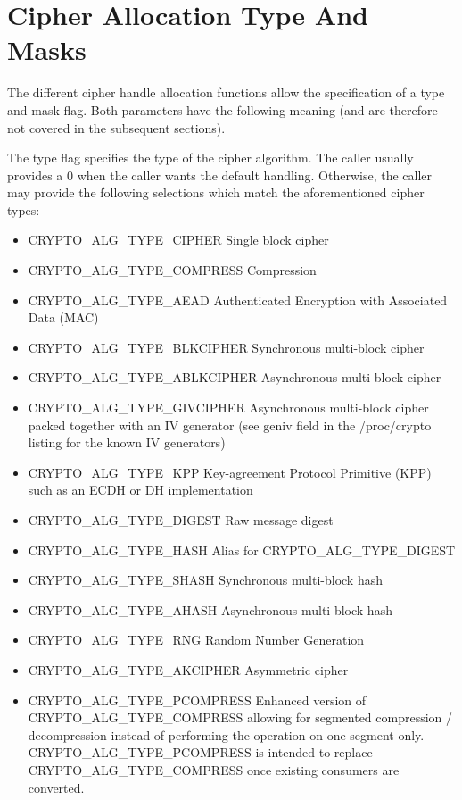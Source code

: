 \documentclass[a4paper,8pt,english]{sphinxmanual}
\begin{document}
\section{Cipher Allocation Type And Masks}
\label{crypto/architecture:cipher-allocation-type-and-masks}
The different cipher handle allocation functions allow the specification
of a type and mask flag. Both parameters have the following meaning (and
are therefore not covered in the subsequent sections).

The type flag specifies the type of the cipher algorithm. The caller
usually provides a 0 when the caller wants the default handling.
Otherwise, the caller may provide the following selections which match
the aforementioned cipher types:
\begin{itemize}
\item {} 
CRYPTO\_ALG\_TYPE\_CIPHER Single block cipher

\item {} 
CRYPTO\_ALG\_TYPE\_COMPRESS Compression

\item {} 
CRYPTO\_ALG\_TYPE\_AEAD Authenticated Encryption with Associated Data
(MAC)

\item {} 
CRYPTO\_ALG\_TYPE\_BLKCIPHER Synchronous multi-block cipher

\item {} 
CRYPTO\_ALG\_TYPE\_ABLKCIPHER Asynchronous multi-block cipher

\item {} 
CRYPTO\_ALG\_TYPE\_GIVCIPHER Asynchronous multi-block cipher packed
together with an IV generator (see geniv field in the /proc/crypto
listing for the known IV generators)

\item {} 
CRYPTO\_ALG\_TYPE\_KPP Key-agreement Protocol Primitive (KPP) such as
an ECDH or DH implementation

\item {} 
CRYPTO\_ALG\_TYPE\_DIGEST Raw message digest

\item {} 
CRYPTO\_ALG\_TYPE\_HASH Alias for CRYPTO\_ALG\_TYPE\_DIGEST

\item {} 
CRYPTO\_ALG\_TYPE\_SHASH Synchronous multi-block hash

\item {} 
CRYPTO\_ALG\_TYPE\_AHASH Asynchronous multi-block hash

\item {} 
CRYPTO\_ALG\_TYPE\_RNG Random Number Generation

\item {} 
CRYPTO\_ALG\_TYPE\_AKCIPHER Asymmetric cipher

\item {} 
CRYPTO\_ALG\_TYPE\_PCOMPRESS Enhanced version of
CRYPTO\_ALG\_TYPE\_COMPRESS allowing for segmented compression /
decompression instead of performing the operation on one segment
only. CRYPTO\_ALG\_TYPE\_PCOMPRESS is intended to replace
CRYPTO\_ALG\_TYPE\_COMPRESS once existing consumers are converted.

\end{itemize}
\end{document}
